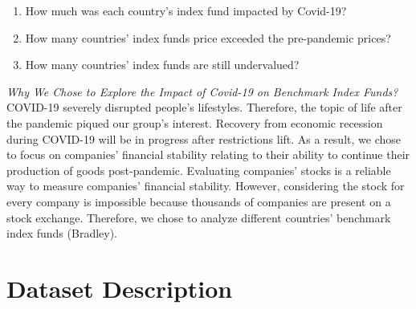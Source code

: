 \documentclass[fontsize=11pt]{article}
\begin{document}
\begin{enumerate}
\setcounter{enumi}{0}
\item How much was each country’s index fund impacted by Covid-19?
\item How many countries’ index funds price exceeded the pre-pandemic prices?
\item How many countries’ index funds are still undervalued? \\
\end{enumerate}
\emph{Why We Chose to Explore the Impact of Covid-19 on Benchmark Index Funds?} \\
COVID-19 severely disrupted people’s lifestyles. Therefore, the topic of life after the pandemic piqued our group’s interest. Recovery from economic recession during COVID-19 will be in progress after restrictions lift. As a result, we chose to focus on companies’ financial stability relating to their ability to continue their production of goods post-pandemic. Evaluating companies’ stocks is a reliable way to measure companies’ financial stability. However, considering the stock for every company is impossible because thousands of companies are present on a stock exchange. Therefore, we chose to analyze different countries’ benchmark index funds (Bradley).
\pagebreak



\section*{Dataset Description}
\end{document}
